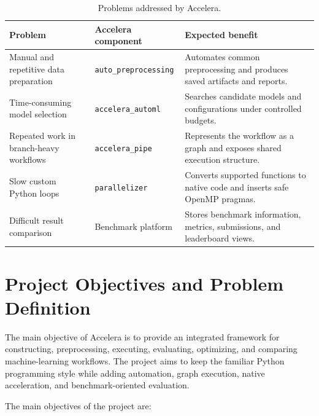 \documentclass[12pt,a4paper]{report}
\begin{document}
\begin{table}[!htbp]
\centering
\caption{Problems addressed by Accelera.}
\label{tab:intro-problems-solutions}
\small
\renewcommand{\arraystretch}{1.15}
\setlength{\tabcolsep}{4pt}
\begin{tabular}{p{}p{}p{}}
\toprule
Problem & Accelera component & Expected benefit \\
\midrule
Manual and repetitive data preparation &
\texttt{auto\_preprocessing} &
Automates common preprocessing and produces saved artifacts and reports. \\

Time-consuming model selection &
\texttt{accelera\_automl} &
Searches candidate models and configurations under controlled budgets. \\

Repeated work in branch-heavy workflows &
\texttt{accelera\_pipe} &
Represents the workflow as a graph and exposes shared execution structure. \\

Slow custom Python loops &
\texttt{parallelizer} &
Converts supported functions to native code and inserts safe OpenMP pragmas. \\

Difficult result comparison &
Benchmark platform &
Stores benchmark information, metrics, submissions, and leaderboard views. \\
\bottomrule
\end{tabular}
\renewcommand{\arraystretch}{1.0}
\end{table}

\section{Project Objectives and Problem Definition}

The main objective of Accelera is to provide an integrated framework for
constructing, preprocessing, executing, evaluating, optimizing, and comparing
machine-learning workflows. The project aims to keep the familiar Python
programming style while adding automation, graph execution, native acceleration,
and benchmark-oriented evaluation.

The main objectives of the project are:
\end{document}
